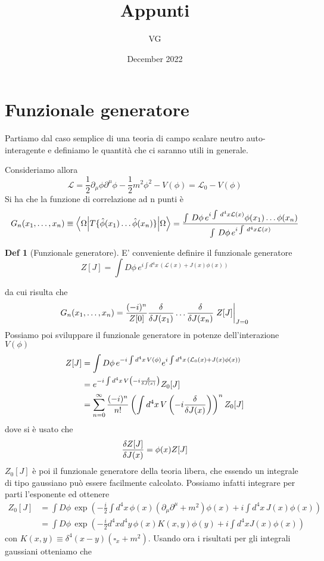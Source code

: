\documentclass[10pt,a4paper]{article}
\title{Appunti}
\author{VG}
\date{December 2022}
\theoremstyle{definition}
\newtheorem{definition}{Def}[section]
\newcommand{\lagr}{\mathcal{L}} %
\begin{document}
\maketitle
\tableofcontents
\section{Funzionale generatore}
Partiamo dal caso semplice di una teoria di campo scalare neutro auto-interagente e definiamo le quantità che ci saranno utili in generale.

Consideriamo allora
\[
\lagr = \frac12 \partial_\mu\phi\partial^\mu\phi - \frac12 m^2 \phi^2 - V(\phi) = \lagr_0 - V(\phi)
\]
Si ha che la funzione di correlazione ad n punti è
\[
G_n (x_1, \dots, x_n) \equiv \ev**{T\{\hat{\phi}(x_1)\dots\hat{\phi}(x_n)\}}{\Omega} = \frac{\int\,D\phi\,e^{i \int \,d^4x\lagr(x)}\phi(x_1)\dots\phi(x_n)}{\int\,D\phi\,e^{i \int \,d^4x\lagr(x)}}
\]
\begin{definition}[Funzionale generatore]
    E' conveniente definire il funzionale generatore 
    \[
    Z[J] = \int D\phi\, e^{i \int d^4x\, (\lagr(x) + J(x)\phi(x))}    
    \]
\end{definition}
da cui risulta che 
\[
G_n(x_1, \dots, x_n) = \frac{(-i)^n}{Z[0]} \fdv{J(x_1)}\dots\fdv{J(x_n)}\eval{Z[J]}_{J = 0}    
\]
Possiamo poi sviluppare il funzionale generatore in potenze dell'interazione $V(\phi)$
\begin{align*}
    Z[J] &= \int D\phi\,e^{-i\int d^4x\,V(\phi)}e^{i \int d^4x \, (\lagr_0(x) + J(x)\phi(x))} \\
    &= e^{-i\int d^4x\,V\left(-i \fdv{J(x)}\right)} Z_0[J] \\
    &= \sum_{n = 0}^{\infty}\frac{(-i)^n}{n!}\left(\int d^4x\,V\left(-i\fdv{J(x)}\right)\right)^n Z_0[J]
\end{align*}
dove si è usato che
\[
\fdv{Z[J]}{J(x)} = \phi(x) Z[J]    
\]
$Z_0[J]$ è poi il funzionale generatore della teoria libera, che essendo un integrale di tipo gaussiano può essere facilmente calcolato. Possiamo infatti integrare per parti l'esponente ed ottenere
\begin{align*}
    Z_0[J] &= \int D\phi\,\exp\left(-\frac{i}{2}\int d^4x\,\phi(x)(\partial_\mu\partial^\mu + m^2)\phi(x) + i\int d^4x\, J(x)\phi(x)\right)  \\
    &= \int D\phi\, \exp\left( -\frac{i}{2} d^4x d^4y\, \phi(x)K(x, y)\phi(y) + i\int d^4x J(x)\phi(x) \right)
\end{align*}
con $K(x, y) \equiv \delta^4(x-y)(\square_x + m^2)$. Usando ora i risultati per gli integrali gaussiani otteniamo che
\end{document}

